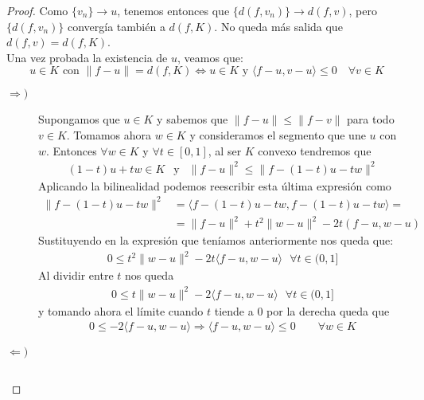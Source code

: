 \begin{teo}[de la Proyección]
\begin{proof}
        Como $\{v_n\}\to u$, tenemos entonces que $\{d(f,v_n)\}\to d(f,v)$, pero $\{d(f,v_n)\}$ convergía también a $d(f,K)$. No queda más salida que $d(f,v) = d(f,K)$.\\

        \noindent
        Una vez probada la existencia de $u$, veamos que:
        \begin{equation*}
            u\in K \text{\ con\ } \|f-u\| = d(f,K) \Longleftrightarrow u\in K \text{\ y\ } \langle f-u,v-u \rangle \leq 0 \quad \forall v\in K
        \end{equation*}
        \begin{description}
            \item [$\Longrightarrow)$] Supongamos que $u\in K$ y sabemos que $\|f-u\|\leq \|f-v\|$ para todo $v\in K$. Tomamos ahora $w\in K$ y consideramos el segmento que une $u$ con $w$. Entonces $\forall w\in K$ y $\forall t \in [0,1]$, al ser $K$ convexo tendremos que
            \begin{gather*}
                (1-t)u + tw \in K\ \  \text{ y }\ \ \|f-u\|^2 \leq \|f-(1-t)u-tw\|^2
            \end{gather*}
            Aplicando la bilinealidad podemos reescribir esta última expresión como 
            \begin{align*}
                \|f-(1-t)u-tw\|^2 &= \langle f-(1-t)u-tw,f-(1-t)u-tw \rangle  =\\
                &=\|f-u\|^2 + t^2\|w-u\|^2-2t(f-u,w-u)
            \end{align*}
            Sustituyendo en la expresión que teníamos anteriormente nos queda que:
            \begin{gather*}
                0\leq t^2\|w-u\|^2-2t\langle f-u,w-u \rangle  \ \ \ \forall t \in (0,1]
            \end{gather*}
            Al dividir entre $t$ nos queda
            \begin{gather*}
                0\leq t\|w-u\|^2-2\langle f-u,w-u \rangle  \ \ \ \forall t \in (0,1]
            \end{gather*}
            y tomando ahora el límite  cuando $t$ tiende a $0$ por la derecha queda que
            \begin{gather*}
                0\leq -2\langle f-u,w-u \rangle  \Rightarrow \langle f-u,w-u \rangle  \leq 0 \qquad \forall w\in K
            \end{gather*}
            \item [$\Longleftarrow)$] 
                \begin{equation*}

\end{equation*}
\end{description}
\end{proof}
\end{teo}
